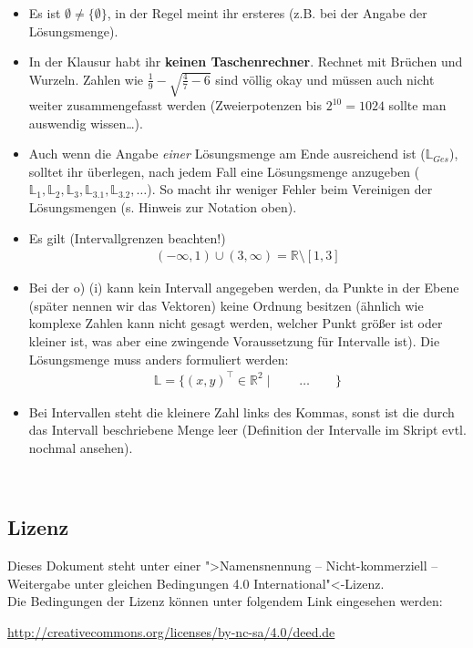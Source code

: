 \documentclass[11pt, a4paper]{article}
\newcommand{\Lsg}{\mathbb{L}}
\newcommand{\R}{\mathbb{R}}
\begin{document}
\begin{itemize}
\item Es ist $\emptyset \neq \{\emptyset\}$, in der Regel meint ihr ersteres (z.B. bei der Angabe der Lösungsmenge).

\item In der Klausur habt ihr \textbf{keinen Taschenrechner}. Rechnet mit Brüchen und Wurzeln. Zahlen wie $\frac{1}{9} - \sqrt{\frac{4}{7}-6}$ sind völlig okay und müssen auch nicht weiter zusammengefasst werden (Zweierpotenzen bis $2^{10} = 1024$ sollte man auswendig wissen\dots).

\item Auch wenn die Angabe \emph{einer} Lösungsmenge am Ende ausreichend ist ($\Lsg_{Ges}$), solltet ihr überlegen, nach jedem Fall eine Lösungsmenge anzugeben ($\Lsg_1, \Lsg_2, \Lsg_3, \Lsg_{3.1}, \Lsg_{3.2}, \dots$). So macht ihr weniger Fehler beim Vereinigen der Lösungsmengen (s. Hinweis zur Notation oben).

\item Es gilt (Intervallgrenzen beachten!)
\begin{align*}
(-\infty, 1) \cup (3, \infty) = \R \setminus [1, 3]
\end{align*}

\item Bei der o) (i) kann kein Intervall angegeben werden, da Punkte in der Ebene (später nennen wir das Vektoren) keine Ordnung besitzen (ähnlich wie komplexe Zahlen kann nicht gesagt werden, welcher Punkt größer ist oder kleiner ist, was aber eine zwingende Voraussetzung für Intervalle ist). Die Lösungsmenge muss anders formuliert werden:
\begin{align*}
\Lsg = \{ (x,y)^\intercal \in \R^2 \mid \qquad \dots \qquad \}
\end{align*}

\item Bei Intervallen steht die kleinere Zahl links des Kommas, sonst ist die durch das Intervall beschriebene Menge leer (Definition der Intervalle im Skript evtl. nochmal ansehen).
\end{itemize}








\newpage
~
\vfill
{\footnotesize
\subsection*{Lizenz}
Dieses Dokument steht unter einer ">Namensnennung -- Nicht-kommerziell -- Weitergabe unter gleichen Bedingungen 4.0 International"<-Lizenz.\\

\noindent
Die Bedingungen der Lizenz können unter folgendem Link eingesehen werden: 

\noindent
\url{http://creativecommons.org/licenses/by-nc-sa/4.0/deed.de}}
\end{document}
